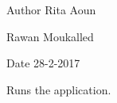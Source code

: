 \begin{DoxyAuthor}{\-Author}
\-Rita \-Aoun 

\-Rawan \-Moukalled 
\end{DoxyAuthor}
\begin{DoxyDate}{\-Date}
28-\/2-\/2017
\end{DoxyDate}
\-Runs the application. 